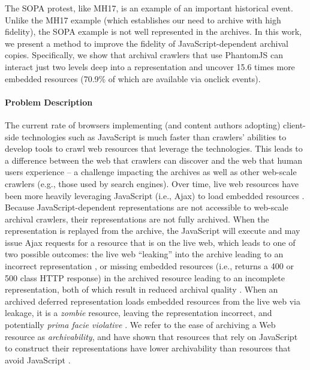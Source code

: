 \documentclass{sig-alternate}
\begin{document}
The SOPA protest, like MH17, is an example of an important historical event. Unlike the MH17 example (which establishes our need to archive with high fidelity), the SOPA example is not well represented in the archives. In this work, we present a method to improve the fidelity of JavaScript-dependent archival copies. %
Specifically, we show that archival crawlers that use PhantomJS can interact just two levels deep into a representation and uncover 15.6 times more embedded resources (70.9\% of which are available via onclick events).

\paragraph{Problem Description}
\label{problem}

The current rate of browsers implementing (and content authors adopting) client-side technologies such as JavaScript is much faster than crawlers' abilities to develop tools to crawl web resources that leverage the technologies. This leads to a difference between the web that crawlers can discover and the web that human users experience -- a challenge impacting the archives as well as other web-scale crawlers (e.g., those used by search engines). Over time, live web resources have been more heavily leveraging JavaScript (i.e., Ajax) to load embedded resources \cite{ijdl}. Because JavaScript-dependent representations are not accessible to web-scale archival crawlers, their representations are not fully archived. When the representation is replayed from the archive, the JavaScript will execute and may issue Ajax requests for a resource that is  on the live web, which leads to one of two possible outcomes: the live web ``leaking'' into the archive leading to an incorrect representation \cite{zombies}, or missing embedded resources (i.e., returns a 400 or 500 class HTTP response) in the archived resource leading to an incomplete representation, both of which result in reduced archival quality \cite{brunelleDamage}. When an archived deferred representation loads embedded resources from the live web via leakage, it is a \emph{zombie} resource, leaving the representation incorrect, and potentially \emph{prima facie violative} \cite{ainsworthFramework}.
We refer to the ease of archiving a Web resource as \emph{archivability}, and have shown that resources that rely on JavaScript to construct their representations have lower archivability than resources that avoid JavaScript \cite{ijdl}.
\end{document}

